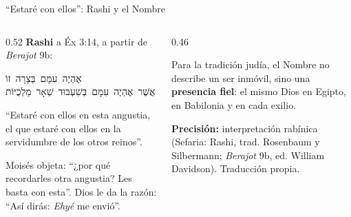 \documentclass[hyperref={bookmarks=false},aspectratio=169]{beamer}
\newcommand{\heb}[1]{\mbox{\foreignlanguage{hebrew}{#1}}}
\newcommand{\destacar}[1]{\textbf{\textcolor{azul}{#1}}}
\newcommand{\precision}[1]{{\footnotesize\color{gris}\textbf{Precisión:} #1}}
\begin{document}
\begin{frame}{``Estaré con ellos'': Rashi y el Nombre}
\begin{columns}[t,onlytextwidth]
\begin{column}{0.52\textwidth}\small
\textbf{Rashi} a Éx 3:14, a partir de \emph{Berajot} 9b:
\begin{center}\heb{אֶהְיֶה עִמָּם בְּצָרָה זוֹ}\\ \heb{אֲשֶׁר אֶהְיֶה עִמָּם בְּשִׁעְבּוּד שְׁאָר מַלְכֻיּוֹת}\end{center}
``Estaré con ellos en esta angustia, el que estaré con ellos en la servidumbre de los otros reinos''.\par\smallskip
Moisés objeta: ``¿por qué recordarles otra angustia? Les basta con esta''. Dios le da la razón: ``Así dirás: \emph{Ehyé} me envió''.
\end{column}
\begin{column}{0.46\textwidth}
\begin{tcolorbox}[colback=papiro,colframe=dorado,boxrule=1.2pt,arc=3pt]
\small Para la tradición judía, el Nombre no describe un ser inmóvil, sino una \destacar{presencia fiel}: el mismo Dios en Egipto, en Babilonia y en cada exilio.
\end{tcolorbox}
\precision{interpretación rabínica (Sefaria: Rashi, trad. Rosenbaum y Silbermann; \emph{Berajot} 9b, ed. William Davidson). Traducción propia.}
\end{column}
\end{columns}
\end{frame}
\end{document}

